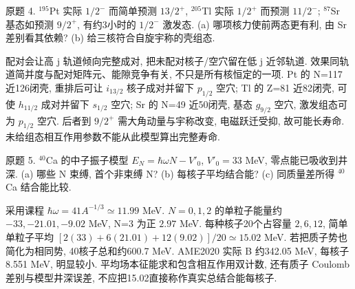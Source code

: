 \begin{exercise}\label{ex:2202-7-4}
原题 4. $^{195}$Pt 实际 $1/2^-$ 而简单预测 $13/2^+$, $^{205}$Tl 实际 $1/2^+$ 而预测 $11/2^-$; $^{87}$Sr 基态如预测 $9/2^+$, 有约3小时的 $1/2^-$ 激发态. (a) 哪项核力使前两态更有利, 由 Sr 差别看其依赖? (b) 给三核符合自旋宇称的壳组态.
\end{exercise}
\begin{solution}
配对会让高 j 轨道倾向完整成对, 把未配对核子/空穴留在低 j 近邻轨道. 效果同轨道简并度与配对矩阵元、能隙竞争有关, 不只是所有核恒定的一项. Pt 的 N=117 近126闭壳, 重排后可让 $i_{13/2}$ 核子成对并留下 $p_{1/2}$ 空穴; Tl 的 Z=81 近82闭壳, 可使 $h_{11/2}$ 成对并留下 $s_{1/2}$ 空穴; Sr 的 N=49 近50闭壳, 基态 $g_{9/2}$ 空穴, 激发组态可为 $p_{1/2}$ 空穴. 后者到 $9/2^+$ 需大角动量与宇称改变, 电磁跃迁受抑, 故可能长寿命. 未给组态相互作用参数不能从此模型算出完整寿命.
\end{solution}
\begin{exercise}\label{ex:2202-7-5}
原题 5. $^{40}$Ca 的中子振子模型 $E_N=\hbar\omega N-V'_0$, $V'_0=33$ MeV, 零点能已吸收到井深. (a) 哪些 N 束缚, 首个非束缚 N? (b) 每核子平均结合能? (c) 同质量差所得 $^{40}$Ca 结合能比较.
\end{exercise}
\begin{solution}
采用课程 $\hbar\omega=41A^{-1/3}\simeq11.99$ MeV. $N=0,1,2$ 的单粒子能量约 $-33,-21.01,-9.02$ MeV, N=3 为正 $2.97$ MeV. 每种核子20个占容量 $2,6,12$, 简单单粒子平均 $[2(33)+6(21.01)+12(9.02)]/20\simeq15.02$ MeV. 若把质子势也简化为相同势, 40核子总和约600.7 MeV. AME2020 实际 B 约342.05 MeV, 每核子8.551 MeV, 明显较小. 平均场本征能求和包含相互作用双计数, 还有质子 Coulomb 差别与模型井深误差, 不应把15.02直接称作真实总结合能每核子.
\end{solution}
